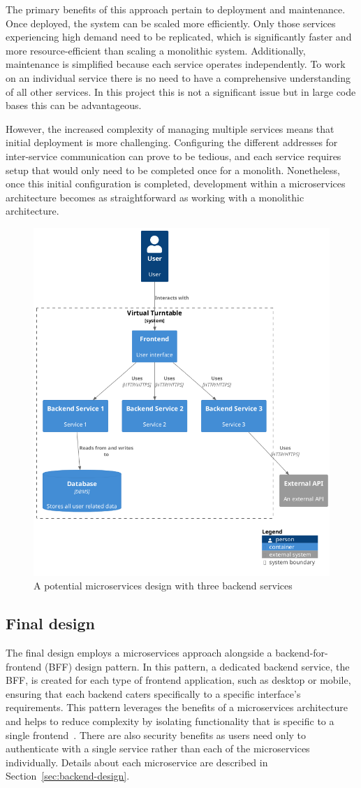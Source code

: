 The primary benefits of this approach pertain to deployment and maintenance. Once deployed, the system can be scaled more efficiently. Only those services experiencing high demand need to be replicated, which is significantly faster and more resource-efficient than scaling a monolithic system. Additionally, maintenance is simplified because each service operates independently. To work on an individual service there is no need to have a comprehensive understanding of all other services. In this project this is not a significant issue but in large code bases this can be advantageous.

However, the increased complexity of managing multiple services means that initial deployment is more challenging. Configuring the different addresses for inter-service communication can prove to be tedious, and each service requires setup that would only need to be completed once for a monolith. Nonetheless, once this initial configuration is completed, development within a microservices architecture becomes as straightforward as working with a monolithic architecture.

\begin{figure} [H]
    \centering
    \includegraphics[width=0.5\linewidth]{figures/microservices_arch.png}
    \caption{A potential microservices design with three backend services}
    \label{fig:microservices-arch}
\end{figure}

\subsection{Final design}
The final design employs a microservices approach alongside a backend-for-frontend (BFF) design pattern. In this pattern, a dedicated backend service, the BFF, is created for each type of frontend application, such as desktop or mobile, ensuring that each backend caters specifically to a specific interface’s requirements. This pattern leverages the benefits of a microservices architecture and helps to reduce complexity by isolating functionality that is specific to a single frontend~\cite{BFF}. There are also security benefits as users need only to authenticate with a single service rather than each of the microservices individually. Details about each microservice are described in Section~\ref{sec:backend-design}.


